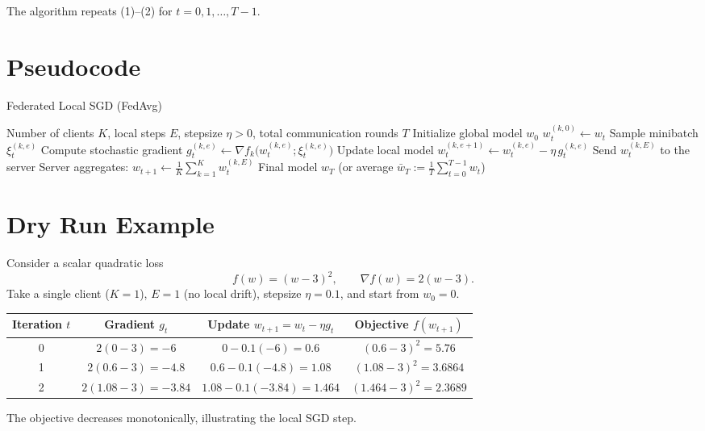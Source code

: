 \documentclass[11pt]{article}
\begin{document}
The algorithm repeats (1)–(2) for \(t=0,1,\dots,T-1\).

\section*{Pseudocode}
\begin{algorithm}[H]
\caption{Federated Local SGD (FedAvg)}
\begin{algorithmic}[1]
\REQUIRE Number of clients \(K\), local steps \(E\), stepsize \(\eta>0\),
          total communication rounds \(T\)
\STATE Initialize global model \(w_0\)
        \STATE \(w_{t}^{(k,0)} \gets w_t\)
            \STATE Sample minibatch \(\xi_{t}^{(k,e)}\)
            \STATE Compute stochastic gradient 
                  \(g_{t}^{(k,e)} \gets \nabla f_k\!\bigl(w_{t}^{(k,e)};\xi_{t}^{(k,e)}\bigr)\)
            \STATE Update local model 
                  \(w_{t}^{(k,e+1)} \gets w_{t}^{(k,e)} - \eta\, g_{t}^{(k,e)}\)
        \ENDFOR
        \STATE Send \(w_{t}^{(k,E)}\) to the server
    \ENDFOR
    \STATE Server aggregates: \(w_{t+1}\gets \frac1K\sum_{k=1}^{K} w_{t}^{(k,E)}\)
\ENDFOR
\RETURN Final model \(w_T\) (or average \(\bar w_T:=\frac1T\sum_{t=0}^{T-1} w_t\))
\end{algorithmic}
\end{algorithm}

\section*{Dry Run Example}
Consider a scalar quadratic loss
\[
f(w)=(w-3)^2 ,\qquad \nabla f(w)=2(w-3).
\]
Take a single client (\(K=1\)), \(E=1\) (no local drift), stepsize
\(\eta=0.1\), and start from \(w_0=0\).

\begin{center}
\begin{tabular}{c|c|c|c}
Iteration \(t\) & Gradient \(g_t\) & Update \(w_{t+1}=w_t-\eta g_t\) & Objective \(f(w_{t+1})\)\\\hline
0 & \(2(0-3)=-6\) & \(0-0.1(-6)=0.6\) & \((0.6-3)^2=5.76\)\\
1 & \(2(0.6-3)=-4.8\) & \(0.6-0.1(-4.8)=1.08\) & \((1.08-3)^2=3.6864\)\\
2 & \(2(1.08-3)=-3.84\) & \(1.08-0.1(-3.84)=1.464\) & \((1.464-3)^2=2.3689\)
\end{tabular}
\end{center}
The objective decreases monotonically, illustrating the local SGD step.
\end{document}
